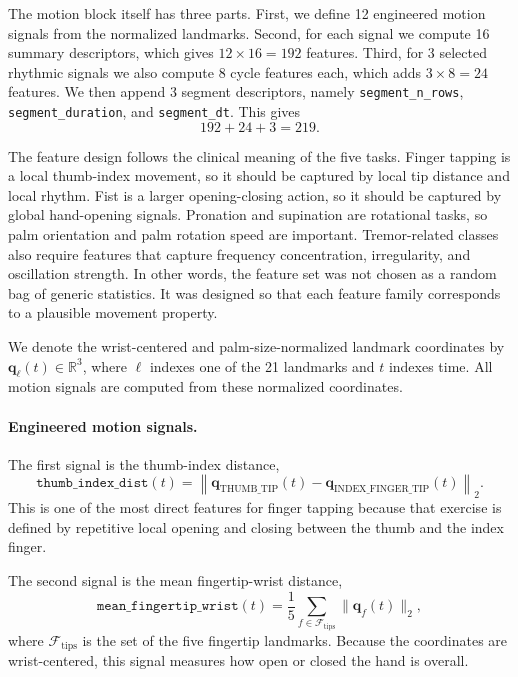 \documentclass[10pt,twocolumn]{article}
\begin{document}
The motion block itself has three parts. First, we define 12 engineered motion signals from the normalized landmarks. Second, for each signal we compute 16 summary descriptors, which gives $12 \times 16 = 192$ features. Third, for 3 selected rhythmic signals we also compute 8 cycle features each, which adds $3 \times 8 = 24$ features. We then append 3 segment descriptors, namely \texttt{segment\_n\_rows}, \texttt{segment\_duration}, and \texttt{segment\_dt}. This gives
\begin{equation}
192 + 24 + 3 = 219.
\end{equation}

The feature design follows the clinical meaning of the five tasks. Finger tapping is a local thumb-index movement, so it should be captured by local tip distance and local rhythm. Fist is a larger opening-closing action, so it should be captured by global hand-opening signals. Pronation and supination are rotational tasks, so palm orientation and palm rotation speed are important. Tremor-related classes also require features that capture frequency concentration, irregularity, and oscillation strength. In other words, the feature set was not chosen as a random bag of generic statistics. It was designed so that each feature family corresponds to a plausible movement property.

We denote the wrist-centered and palm-size-normalized landmark coordinates by $\mathbf{q}_{\ell}(t) \in \mathbb{R}^3$, where $\ell$ indexes one of the 21 landmarks and $t$ indexes time. All motion signals are computed from these normalized coordinates.

\paragraph{Engineered motion signals.}
The first signal is the thumb-index distance,
\begin{equation}
\texttt{thumb\_index\_dist}(t)=\left\|\mathbf{q}_{\mathrm{THUMB\_TIP}}(t)-\mathbf{q}_{\mathrm{INDEX\_FINGER\_TIP}}(t)\right\|_2.
\end{equation}
This is one of the most direct features for finger tapping because that exercise is defined by repetitive local opening and closing between the thumb and the index finger.

The second signal is the mean fingertip-wrist distance,
\begin{equation}
\texttt{mean\_fingertip\_wrist}(t)=\frac{1}{5}\sum_{f \in \mathcal{F}_{\mathrm{tips}}} \|\mathbf{q}_{f}(t)\|_2,
\end{equation}
where $\mathcal{F}_{\mathrm{tips}}$ is the set of the five fingertip landmarks. Because the coordinates are wrist-centered, this signal measures how open or closed the hand is overall.
\end{document}
